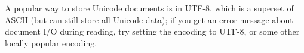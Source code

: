 A popular way to store Unicode
documents is in UTF-8, which is a superset of ASCII (but can still store all
Unicode data); if you get
an error message about document I/O during reading, try setting the encoding
to UTF-8, or some other locally popular encoding.

